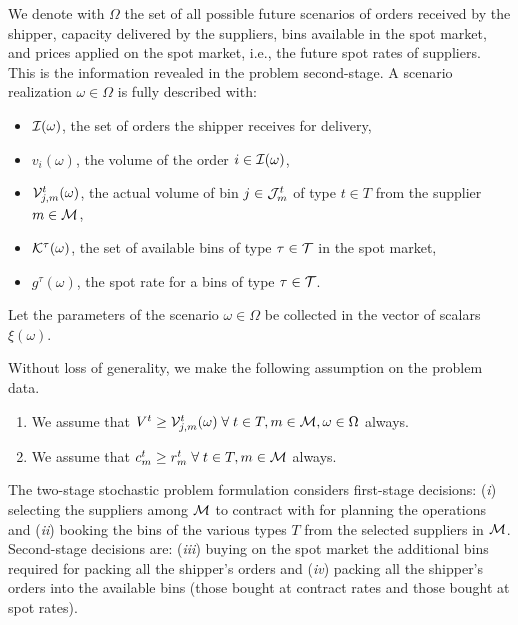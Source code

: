 \documentclass[a4paper,11pt]{article}
\begin{document}
	We denote with $\Omega$ the set of all possible future scenarios of orders received by the shipper, capacity delivered by the suppliers, bins available in the spot market, and prices applied on the spot market, i.e., the future spot rates of suppliers.
	This is the information revealed in the problem second-stage.
	A scenario realization $\omega \in \Omega$ is fully described with:
	\begin{itemize}
		\item ${\cal I}(\omega)$, the set of orders the shipper receives for delivery, 
		\item $v_i(\omega)$, the volume of the order $i \in {\cal I}(\omega)$,
		\item ${\cal V}_{j,m}^t(\omega)$, the actual volume of bin $j \in {\cal J}^{t}_{m}$ of type $t \in T$ from the supplier $m \in \cal{M}$, 
		\item ${\cal K}^{\tau}(\omega)$, the set of available bins of type $\tau \in \cal T$ in the spot market, %
		\item $g^{\tau}(\omega)$, the spot rate for a bins of type $\tau \in {\cal T}$.
	\end{itemize}
	Let the parameters of the scenario $\omega \in \Omega$ be collected in the vector of scalars $\xi(\omega)$.
	
	Without loss of generality, we make the following assumption on the problem data.
	\begin{enumerate}
		\item We assume that $V^{t} \ge {\cal V}_{j,m}^t(\omega) \; \forall \; t \in T, m \in {\cal M}, \omega \in \Omega $ always.
		\item We assume that $c_{m}^t \ge r_{m}^t \; \forall \; t \in T, m \in \cal{M}$ always.
	\end{enumerate}
	
	The two-stage stochastic problem formulation considers first-stage decisions:
	(\textit{i}) selecting the suppliers among $ {\cal M}$ to contract with for planning the operations and
	(\textit{ii}) booking the bins of the various types $ T$ from the selected suppliers in $ {\cal M}$.
	Second-stage decisions are:
	(\textit{iii}) buying on the spot market the additional bins required for packing all the shipper's orders and
	(\textit{iv}) packing all the shipper's orders into the available bins (those bought at contract rates and those bought at spot rates).
	
\end{document}
